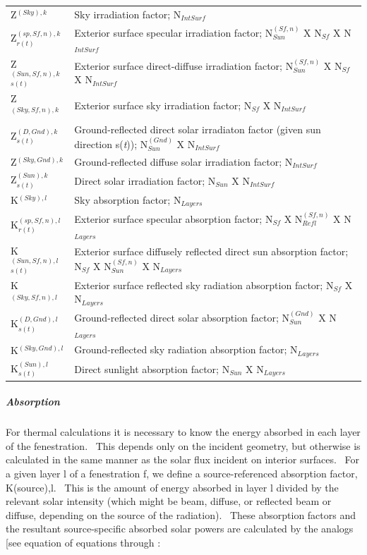 \begin{longtable}[c]{p{1.5in}p{4.5in}}
Z\(^{(Sky), k}\) & Sky irradiation factor; N\(_{IntSurf}\) \tabularnewline
Z\(^{(sp,Sf,n),k}_{r(t)}\) & Exterior surface specular irradiation factor; N\(^{(Sf,n)}_{Sun}\) X N\(_{Sf}\) X N\(_{IntSurf}\) \tabularnewline
Z\(^{(Sun,Sf,n),k}_{s(t)}\) & Exterior surface direct-diffuse irradiation factor; N\(^{(Sf,n)}_{Sun}\) X N\(_{Sf}\) X N\(_{IntSurf}\) \tabularnewline
Z\(^{(Sky,Sf,n),k}\) & Exterior surface sky irradiation factor; N\(_{Sf}\) X N\(_{IntSurf}\) \tabularnewline
Z\(^{(D,Gnd),k}_{s(t)}\) & Ground-reflected direct solar irradiaton factor (given sun direction s(\emph{t})); N\(^{(Gnd)}_{Sun}\) X N\(_{IntSurf}\) \tabularnewline
Z\(^{(Sky,Gnd),k}\) & Ground-reflected diffuse solar irradiation factor; N\(_{IntSurf}\) \tabularnewline
Z\(^{(Sun),k}_{s(t)}\) & Direct solar irradiation factor; N\(_{Sun}\) X N\(_{IntSurf}\) \tabularnewline
K\(^{(Sky),l}\) & Sky absorption factor; N\(_{Layers}\) \tabularnewline
K\(^{(sp,Sf,n),l}_{r(t)}\) & Exterior surface specular absorption factor; N\(_{Sf}\) X N\(^{(Sf,n)}_{Refl}\) X N\(_{Layers}\) \tabularnewline
K\(^{(Sun,Sf,n),l}_{s(t)}\) & Exterior surface diffusely reflected direct sun absorption factor; N\(_{Sf}\) X N\(^{(Sf,n)}_{Sun}\) X N\(_{Layers}\) \tabularnewline
K\(^{(Sky,Sf,n),l}\) & Exterior surface reflected sky radiation absorption factor; N\(_{Sf}\) X N\(_{Layers}\) \tabularnewline
K\(^{(D,Gnd),l}_{s(t)}\) & Ground-reflected direct solar absorption factor; N\(^{(Gnd)}_{Sun}\) X N\(_{Layers}\) \tabularnewline
K\(^{(Sky,Gnd),l}\) & Ground-reflected sky radiation absorption factor; N\(_{Layers}\) \tabularnewline
K\(^{(Sun),l}_{s(t)}\) & Direct sunlight absorption factor; N\(_{Sun}\) X N\(_{Layers}\) \tabularnewline
\bottomrule
\end{longtable}

\subparagraph{Absorption}\label{absorption}

For thermal calculations it is necessary to know the energy absorbed in each layer of the fenestration.~ This depends only on the incident geometry, but otherwise is calculated in the same manner as the solar flux incident on interior surfaces. ~For a given layer l of a fenestration f, we define a source-referenced absorption factor, K(source),l.~ This is the amount of energy absorbed in layer l divided by the relevant solar intensity (which might be beam, diffuse, or reflected beam or diffuse, depending on the source of the radiation).~ These absorption factors and the resultant source-specific absorbed solar powers are calculated by the analogs {[}see equation of equations through :

